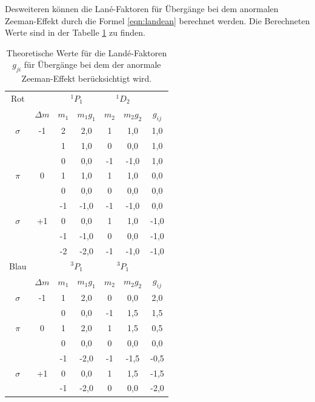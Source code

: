 Desweiteren können die Lané-Faktoren für Übergänge
bei dem anormalen Zeeman-Effekt durch die Formel \eqref{eqn:landean} berechnet werden.
Die Berechneten Werte sind in der Tabelle \ref{tab:theo2}
zu finden.

\begin{table}
  \centering
  \caption{Theoretische Werte für die Landé-Faktoren $g_{ji}$ für Übergänge bei
  dem der anormale Zeeman-Effekt berücksichtigt wird.}
  \label{tab:theo2}
\begin{tabular}{c c c c c c c}
  \toprule
Rot      &            &  \multicolumn{2}{c}{$^1P_1$}  & \multicolumn{2}{c}{$^1D_2$} &    \\
      & $\Delta m$ &   $m_1$&  $m_1g_1$            & $m_2$    & $m_2g_2$         & $g_{ij}$\\
\midrule
$\sigma$ &  -1 &    2 &  2,0     &  1  &  1,0  &  1,0  \\
       &       &    1 &  1,0     &  0  &  0,0  &  1,0  \\
       &       &    0 &  0,0     & -1  & -1,0  &  1,0  \\
$\pi$    &   0   &    1 &  1,0   &  1  &  1,0  &  0,0  \\
       &       &    0 &  0,0     &  0  & 0,0   &  0,0  \\
       &       &   -1 & -1,0     & -1  & -1,0  &  0,0 \\
$\sigma$ &  +1   &    0 &  0,0   &  1  & 1,0   & -1,0  \\
       &       &   -1 & -1,0     &  0  & 0,0   & -1,0  \\
       &       &   -2 & -2,0     & -1  & -1,0  & -1,0  \\
\midrule
\midrule
Blau &            &  \multicolumn{2}{c}{$^3P_1$}  & \multicolumn{2}{c}{$^3P_1$} &    \\
& $\Delta m$ &   $m_1$&  $m_1g_1$            & $m_2$    & $m_2g_2$         & $g_{ij}$\\
  \midrule
$\sigma$ &  -1   &    1 &  2,0     &  0  & 0,0  &  2,0  \\
       &       &    0 &  0,0     & -1  & 1,5  &  1,5  \\
$\pi $   &   0   &    1 &  2,0     &  1  & 1,5  &  0,5  \\
       &       &    0 &  0,0     &  0  & 0,0  &  0,0  \\
       &       &   -1 & -2,0     & -1  & -1,5 & -0,5  \\
$\sigma$ &  +1   &    0 &  0,0     &  1  & 1,5  & -1,5  \\
       &       &   -1 & -2,0     &  0  & 0,0  & -2,0  \\
\bottomrule
\end{tabular}
\end{table}

